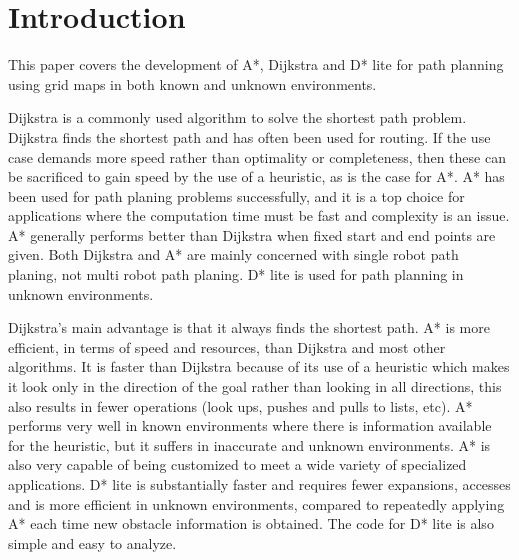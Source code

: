 \section{Introduction}

This paper covers the development of A*, Dijkstra and D* lite for path planning using grid maps in both known and unknown environments.


Dijkstra is a commonly used algorithm to solve the shortest path problem\:\cite{rachmawati_analysis_2020}. Dijkstra finds the shortest path and has often been used for routing\:\cite{rachmawati_analysis_2020}.
If the use case demands more speed rather than optimality or completeness, then these can be sacrificed to gain speed by the use of a heuristic, as is the case for A*\:\cite{rachmawati_analysis_2020}.
A* has been used for path planing problems successfully, and it is a top choice for applications where the computation time must be fast and complexity is an issue\:\cite{foead_systematic_2021}.
A* generally performs better than Dijkstra when fixed start and end points are given\:\cite{bhateja_performance_2021}.
Both Dijkstra and A* are mainly concerned with single robot path planing, not multi robot path planing\:\cite{ogata_generic_2020}\cite{foead_systematic_2021}.
D* lite is used for path planning in unknown environments\:\cite{koenig_dlite_2002}.


Dijkstra's main advantage is that it always finds the shortest path\:\cite{ogata_generic_2020}.
A* is more efficient, in terms of speed and resources, than Dijkstra and most other algorithms\:\cite{patel_comparative_2021}\:\cite{foead_systematic_2021}. It is faster than Dijkstra because of its use of a heuristic which makes it look only in the direction of the goal rather than looking in all directions, this also results in fewer operations (look ups, pushes and pulls to lists, etc)\:\cite{rachmawati_analysis_2020}\cite{bhateja_performance_2021}. A* performs very well in known environments where there is information available for the heuristic, but it suffers in inaccurate and unknown environments\:\cite{foead_systematic_2021}. A* is also very capable of being customized to meet a wide variety of specialized applications\:\cite{foead_systematic_2021}.
D* lite is substantially faster and requires fewer expansions, accesses and is more efficient in unknown environments, compared to repeatedly applying A* each time new obstacle information is obtained\:\cite{koenig_dlite_2002}.
The code for D* lite is also simple and easy to analyze\:\cite{koenig_dlite_2002}.

